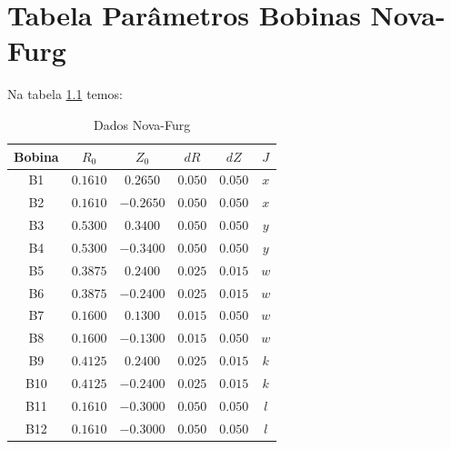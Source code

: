 \documentclass[12pt,oneside,a4paper]{abntex2}
\begin{document}
\chapter{Tabela Parâmetros Bobinas Nova-Furg}
Na tabela \ref{tab-nova} temos: 
\begin{table}[h]
\begin{center}
	\caption{Dados Nova-Furg}\label{tab-nova}
	\begin{tabular}{|c | c | c | c  |c | c |}
		\hline
		 Bobina & $R_0$ & $Z_0$ & $dR$ & $dZ$ & $J$ \\
		\hline
		 B1 & $0.1610$ & $0.2650$ & $0.050$ & $0.050$ & $ x $ \\
		 		\hline
		 B2 & $0.1610$ & $-0.2650$ & $0.050$ & $0.050$ & $ x $ \\
		 		\hline
		 B3 & $0.5300$ & $0.3400$ & $0.050$ & $0.050$ & $ y $ \\
		 		\hline
		 B4 & $0.5300$ & $-0.3400$ & $0.050$ & $0.050$ & $ y$ \\    
		 		\hline
         B5 & $0.3875$ & $0.2400$ & $0.025$ & $0.015$ & $w$ \\    
         		\hline
         B6 & $0.3875$ & $-0.2400$ & $0.025$ & $0.015$ & $w$ \\
         		\hline
         B7 & $0.1600$ & $0.1300$ & $0.015$ & $0.050$ & $ w $ \\     
         		\hline
         B8 & $0.1600$ & $-0.1300$ & $0.015$ & $0.050$ & $ w $ \\         
         		\hline
         B9 & $0.4125$ & $0.2400$ & $0.025$ & $0.015$ & $ k $ \\         
         		\hline
         B10 & $0.4125$ & $-0.2400$ & $0.025$ & $0.015$ & $ k $ \\         
         		\hline
         B11 & $0.1610$ & $-0.3000$ & $0.050$ & $0.050$ & $ l $ \\         
         		\hline
         B12 & $0.1610$ & $-0.3000$ & $0.050$ & $0.050$ & $ l $ \\         
         		\hline         		         		         		         		
	\end{tabular}
\end{center}
\end{table}
\end{document}
